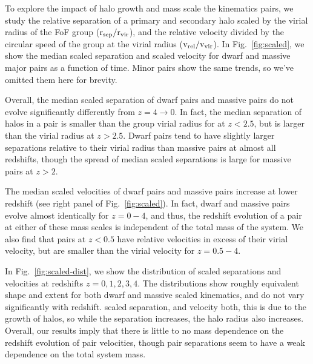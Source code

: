\documentclass[twocolumn]{aastex631}
\newcommand{\scsep}{\ensuremath{\rm r_{sep}/r_{vir}}}
\newcommand{\scvel}{\ensuremath{\rm v_{rel}/v_{vir}}}
\begin{document}
    To explore the impact of halo growth and mass scale the kinematics pairs, we study the relative separation of a primary and secondary halo scaled by the virial radius of the FoF group (\scsep), and the relative velocity divided by the circular speed of the group at the virial radius (\scvel).     
    In Fig.~\ref{fig:scaled}, we show the median scaled separation and scaled velocity for dwarf and massive major pairs as a function of time. 
    Minor pairs show the same trends, so we've omitted them here for brevity.
    
    Overall, the median scaled separation of dwarf pairs and massive pairs do not evolve significantly differently from $z=4\to0$.
    In fact, the median separation of halos in a pair is smaller than the group virial radius for at $z<2.5$, but is larger than the virial radius at $z>2.5$.
    Dwarf pairs tend to have slightly larger separations relative to their virial radius than massive pairs at almost all redshifts, though the spread of median scaled separations is large for massive pairs at $z>2$. 

    The median scaled velocities of dwarf pairs and massive pairs increase at lower redshift (see right panel of Fig.~\ref{fig:scaled}). In fact, dwarf and massive pairs evolve almost identically for $z=0-4$, and thus, the redshift evolution of a pair at either of these mass scales is independent of the total mass of the system. 
    We also find that pairs at $z<0.5$ have relative velocities in excess of their virial velocity, but are smaller than the virial velocity for $z=0.5-4$.
     
    In Fig.~\ref{fig:scaled-dist}, we show the distribution of scaled separations and velocities at redshifts $z=0,1,2,3,4$. 
    The distributions show roughly equivalent shape and extent for both dwarf and massive scaled kinematics, and do not vary significantly with redshift. 
    scaled separation, and velocity both, this is due to the growth of halos, so while the separation increases, the halo radius also increases.
    Overall, our results imply that there is little to no mass dependence on the redshift evolution of pair velocities, though pair separations seem to have a weak dependence on the total system mass. 
\end{document}

